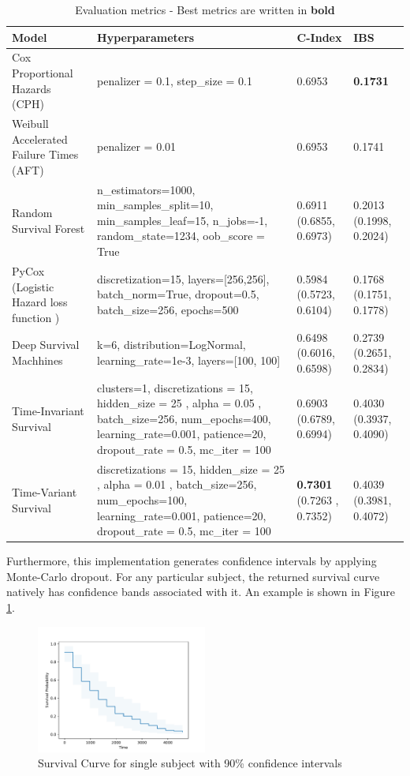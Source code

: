 \documentclass[%
 reprint,
 amsmath,amssymb,
 aps,nofootinbib
]{revtex4-2}
\begin{document}
\begin{table}
  \centering
  \begin{tabular}{|p{4cm}|p{10cm}|p{1.5cm}|p{1.5cm}|}
     \hline
    \textbf{Model} & \textbf{Hyperparameters} & \textbf{C-Index} & \textbf{IBS} \\
    \hline
    Cox Proportional Hazards (CPH) & penalizer = 0.1, step\_size = 0.1 & 0.6953 & \textbf{0.1731}\\
    \hline
    Weibull Accelerated Failure Times (AFT) & penalizer = 0.01  & 0.6953 & 0.1741\\
    \hline
    Random Survival Forest & n\_estimators=1000, min\_samples\_split=10, min\_samples\_leaf=15, n\_jobs=-1, random\_state=1234, oob\_score = True  & 0.6911 (0.6855, 0.6973) & 0.2013 (0.1998, 0.2024)\\
    \hline
    PyCox (Logistic Hazard loss function \cite{kvamme_continuous_2019}) & discretization=15, layers=[256,256],  batch\_norm=True, dropout=0.5, batch\_size=256, epochs=500 & 0.5984 (0.5723, 0.6104)& 0.1768 (0.1751, 0.1778)\\
    \hline
    Deep Survival Machhines & k=6, distribution=LogNormal, learning\_rate=1e-3, layers=[100, 100] & 0.6498 (0.6016, 0.6598) & 0.2739 (0.2651, 0.2834)\\
    \hline
    Time-Invariant Survival & clusters=1, discretizations = 15, hidden\_size = 25 , alpha = 0.05 , batch\_size=256, num\_epochs=400, learning\_rate=0.001, patience=20, dropout\_rate = 0.5, mc\_iter = 100 & 0.6903 (0.6789, 0.6994) &0.4030 (0.3937, 0.4090) \\
    \hline
    Time-Variant Survival & discretizations = 15, hidden\_size = 25 , alpha = 0.01 , batch\_size=256, num\_epochs=100, learning\_rate=0.001, patience=20, dropout\_rate = 0.5, mc\_iter = 100  & \textbf{0.7301} (0.7263 , 0.7352) & 0.4039 (0.3981, 0.4072)\\
    \hline
  \end{tabular}
  \caption{Evaluation metrics - Best metrics are written in \textbf{bold}}
  \label{tab:eval}
\end{table}


Furthermore, this implementation generates confidence intervals by applying Monte-Carlo dropout. For any particular subject, the returned survival curve natively has confidence bands associated with it. An example is shown in Figure \ref{fig:example_survival_graph}.\\

\begin{figure}
  \centering
  \includegraphics[width=0.5\textwidth]{example_survival_graph.pdf}
  \caption{Survival Curve for single subject with 90\% confidence intervals}
  \label{fig:example_survival_graph}
\end{figure}
\end{document}
